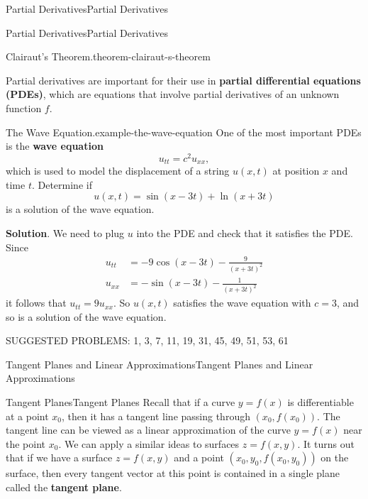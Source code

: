 \documentclass[10pt,]{book}
\newcommand{\terminology}[1]{\textbf{#1}}
\numberwithin{equation}{section}
\begin{document}
\begin{chapterptx}{Partial Derivatives}{}{Partial Derivatives}{}{}
\begin{sectionptx}{Partial Derivatives}{}{Partial Derivatives}{}{}
\begin{theorem}{Clairaut's Theorem.}{}{theorem-clairaut-s-theorem}
\end{theorem}
\hypertarget{p-1149}{}%
Partial derivatives are important for their use in \terminology{partial differential equations (PDEs)}, which are equations that involve partial derivatives of an unknown function \(f\).%
\begin{example}{The Wave Equation.}{example-the-wave-equation}%
\hypertarget{p-1150}{}%
One of the most important PDEs is the \terminology{wave equation}%
\begin{equation*}
u_{tt} = c^{2}u_{xx},
\end{equation*}
which is used to model the displacement of a string \(u(x,t)\) at position \(x\) and time \(t\). Determine if%
\begin{equation*}
u(x,t) = \sin(x-3t) + \ln(x+3t)
\end{equation*}
is a solution of the wave equation.%
\par\smallskip%
\noindent\textbf{Solution}.\hypertarget{solution-178}{}\quad%
\hypertarget{p-1151}{}%
We need to plug \(u\) into the PDE and check that it satisfies the PDE. Since%
\begin{align*}
u_{tt} & = -9\cos(x-3t) - \frac{9}{(x+3t)^{2}} \\
u_{xx} & = -\sin(x-3t) - \frac{1}{(x+3t)^{2}} 
\end{align*}
it follows that \(u_{tt} = 9u_{xx}\). So \(u(x,t)\) satisfies the wave equation with \(c=3\), and so is a solution of the wave equation.%
\end{example}
\hypertarget{p-1152}{}%
SUGGESTED PROBLEMS: 1, 3, 7, 11, 19, 31, 45, 49, 51, 53, 61%
\end{sectionptx}
%
%
\typeout{************************************************}
\typeout{************************************************}
%
\begin{sectionptx}{Tangent Planes and Linear Approximations}{}{Tangent Planes and Linear Approximations}{}{}\label{section-tangent-planes-and-linear-approximations}
%
%
\typeout{************************************************}
\typeout{************************************************}
%
\begin{subsectionptx}{Tangent Planes}{}{Tangent Planes}{}{}\label{subsection-tangent-planes}
\hypertarget{p-1153}{}%
Recall that if a curve \(y=f(x)\) is differentiable at a point \(x_{0}\), then it has a tangent line passing through \((x_{0},f(x_{0})).\) The tangent line can be viewed as a linear approximation of the curve \(y=f(x)\) near the point \(x_{0}\). We can apply a similar ideas to surfaces \(z = f(x,y)\). It turns out that if we have a surface \(z = f(x,y)\) and a point \((x_{0},y_{0}, f(x_{0},y_{0}))\) on the surface, then every tangent vector at this point is contained in a single plane called the \terminology{tangent plane}.%

\end{subsectionptx}
\end{sectionptx}
\end{chapterptx}
\end{document}
